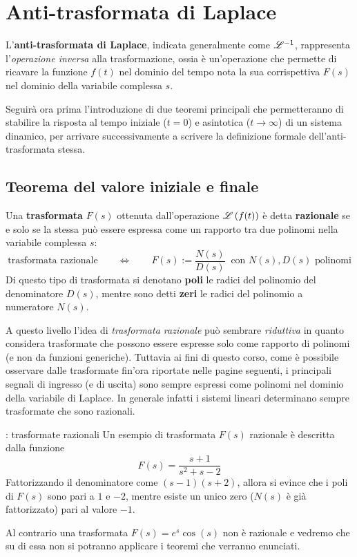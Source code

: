 		
\section{Anti-trasformata di Laplace}
	L'\textbf{anti-trasformata di Laplace}, indicata generalmente come $\mathscr {L}^{-1}$, rappresenta l'\textit{operazione inversa} alla trasformazione, ossia è un'operazione che permette di ricavare la funzione $f(t)$ nel dominio del tempo nota la sua corrispettiva $F(s)$ nel dominio della variabile complessa $s$.
	
	Seguirà ora prima l'introduzione di due teoremi principali che permetteranno di stabilire la risposta al tempo iniziale ($t=0$) e asintotica ($t\rightarrow \infty$) di un sistema dinamico, per arrivare successivamente a scrivere la definizione formale dell'anti-trasformata stessa.
	
	\subsection{Teorema del valore iniziale e finale}
		
		\begin{concetto}
			Una \textbf{trasformata} $F(s)$ ottenuta dall'operazione $\mathscr L \left( f(t) \right)$ è detta \textbf{razionale} se e solo se la stessa può essere espressa come un rapporto tra due polinomi nella variabile complessa $s$:
			\[ \textrm{trasformata razionale} \qquad \Leftrightarrow \qquad F(s) := \frac{N(s)}{D(s)} \ \textrm{ con $N(s), D(s)$ polinomi}  \]			
			Di questo tipo di trasformata si denotano \textbf{poli} le radici del polinomio del denominatore $D(s)$, mentre sono detti \textbf{zeri} le radici del polinomio a numeratore $N(s)$.
		\end{concetto}
		\begin{nota}
			A questo livello l'idea di \textit{trasformata razionale} può sembrare \textit{riduttiva} in quanto considera trasformate che possono essere espresse solo come rapporto di polinomi (e non da funzioni generiche). Tuttavia ai fini di questo corso, come è possibile osservare dalle trasformate fin'ora riportate nelle pagine seguenti, i principali segnali di ingresso (e di uscita) sono sempre espressi come polinomi nel dominio della variabile di Laplace. In generale infatti i sistemi lineari determinano sempre trasformate che sono razionali.
		\end{nota}
		\begin{esempio}{: trasformate razionali}
			Un esempio di trasformata $F(s)$ razionale è descritta dalla funzione
			\[ F(s) = \frac{s+1}{s^2 +s-2}\]
			Fattorizzando il denominatore come $(s-1)(s+2)$, allora si evince che i poli di $F(s)$ sono pari a $1$ e $-2$, mentre esiste un unico zero ($N(s)$ è già fattorizzato) pari al valore $-1$.
			
			Al contrario una trasformata $F(s) = e^s \cos(s)$ non è razionale e vedremo che su di essa non si potranno applicare i teoremi che verranno enunciati.
		\end{esempio}
		
